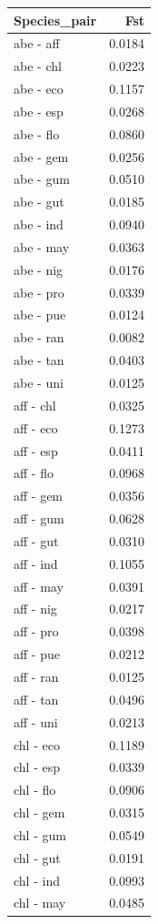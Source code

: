 
\begin{tabular}{lr}
\toprule
Species\_pair & Fst\\
\midrule
abe - aff & 0.0184\\
abe - chl & 0.0223\\
abe - eco & 0.1157\\
abe - esp & 0.0268\\
abe - flo & 0.0860\\
\addlinespace
abe - gem & 0.0256\\
abe - gum & 0.0510\\
abe - gut & 0.0185\\
abe - ind & 0.0940\\
abe - may & 0.0363\\
\addlinespace
abe - nig & 0.0176\\
abe - pro & 0.0339\\
abe - pue & 0.0124\\
abe - ran & 0.0082\\
abe - tan & 0.0403\\
\addlinespace
abe - uni & 0.0125\\
aff - chl & 0.0325\\
aff - eco & 0.1273\\
aff - esp & 0.0411\\
aff - flo & 0.0968\\
\addlinespace
aff - gem & 0.0356\\
aff - gum & 0.0628\\
aff - gut & 0.0310\\
aff - ind & 0.1055\\
aff - may & 0.0391\\
\addlinespace
aff - nig & 0.0217\\
aff - pro & 0.0398\\
aff - pue & 0.0212\\
aff - ran & 0.0125\\
aff - tan & 0.0496\\
\addlinespace
aff - uni & 0.0213\\
chl - eco & 0.1189\\
chl - esp & 0.0339\\
chl - flo & 0.0906\\
chl - gem & 0.0315\\
\addlinespace
chl - gum & 0.0549\\
chl - gut & 0.0191\\
chl - ind & 0.0993\\
chl - may & 0.0485\\

\end{tabular}
